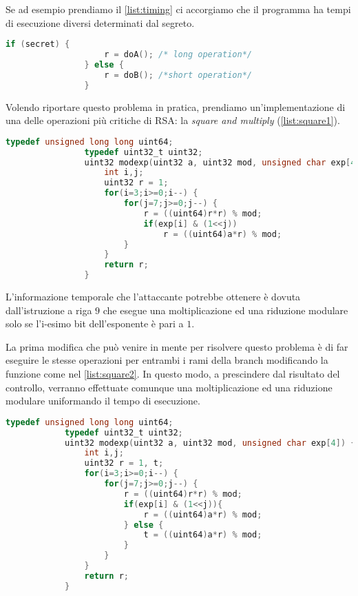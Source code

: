		Se ad esempio prendiamo il \cref{list:timing} ci accorgiamo che il programma ha tempi di esecuzione diversi determinati dal segreto.
		
		\begin{center}
			\begin{lstlisting}[language={C},caption={Codice da proteggere},label={list:timing}]
				if (secret) {
					r = doA(); /* long operation*/
				} else {
					r = doB(); /*short operation*/
				}
			\end{lstlisting}
		\end{center}
		
		Volendo riportare questo problema in pratica, prendiamo un'implementazione di una delle operazioni più critiche di RSA: la \emph{square and multiply} (\cref{list:square1}).
		
		\begin{center}
			\begin{lstlisting}[language={C},caption={RSA, square and multiply v1},label={list:square1}]
				typedef unsigned long long uint64;
				typedef uint32_t uint32;
				uint32 modexp(uint32 a, uint32 mod, unsigned char exp[4]) {
					int i,j;
					uint32 r = 1;
					for(i=3;i>=0;i--) {
						for(j=7;j>=0;j--) {
							r = ((uint64)r*r) % mod;
							if(exp[i] & (1<<j))
								r = ((uint64)a*r) % mod;
						}
					}
					return r;
				}
			\end{lstlisting}
		\end{center}
		
		L'informazione temporale che l'attaccante potrebbe ottenere è dovuta dall'istruzione a riga $9$ che esegue una moltiplicazione ed una riduzione modulare solo se l'i-esimo bit dell'esponente è pari a $1$.
		
		La prima modifica che può venire in mente per risolvere questo problema è di far eseguire le stesse operazioni per entrambi i rami della branch modificando la funzione come nel \cref{list:square2}. In questo modo, a prescindere dal risultato del controllo, verranno effettuate comunque una moltiplicazione ed una riduzione modulare uniformando il tempo di esecuzione.
		
		\begin{center}
			\begin{lstlisting}[language={C},caption={RSA, square and multiply v2},label={list:square2}]
			typedef unsigned long long uint64;
			typedef uint32_t uint32;
			uint32 modexp(uint32 a, uint32 mod, unsigned char exp[4]) {
				int i,j;
				uint32 r = 1, t;
				for(i=3;i>=0;i--) {
					for(j=7;j>=0;j--) {
						r = ((uint64)r*r) % mod;
						if(exp[i] & (1<<j)){
							r = ((uint64)a*r) % mod;
						} else {
							t = ((uint64)a*r) % mod;
						}
					}
				}
				return r;
			}
			\end{lstlisting}
		\end{center}
	
